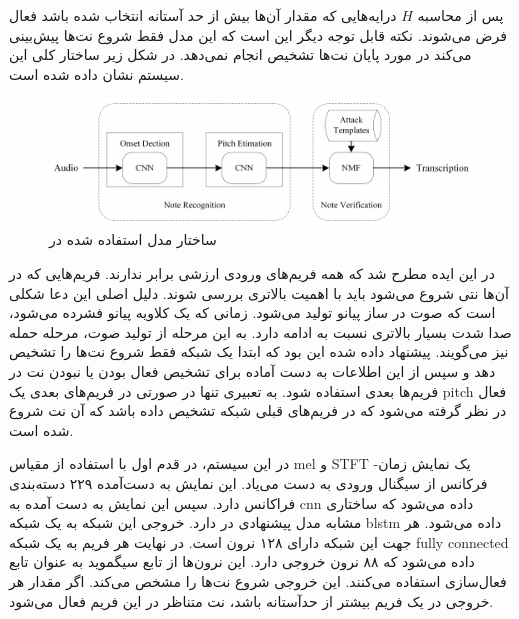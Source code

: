پس از محاسبه $H$ درایه‌هایی که مقدار آن‌ها بیش از حد آستانه انتخاب شده باشد فعال
فرض می‌شوند. نکته قابل توجه دیگر این است که این مدل فقط شروع نت‌ها پیش‌بینی
می‌کند در مورد پایان نت‌ها تشخیص انجام نمی‌دهد. در شکل زیر ساختار کلی این سیستم
نشان داده شده است.
\begin{figure}[ht]
    \centering
    \includegraphics[width=12cm]{./statics/wang2017two_architecture.png}
    \caption{ساختار مدل استفاده شده در \cite{wang2017two}}
\end{figure}

در \cite{hawthorne2017onsets} این ایده مطرح شد که همه فریم‌‌های ورودی ارزشی برابر
ندارند. فریم‌هایی که در آن‌ها نتی شروع می‌شود باید با اهمیت بالاتری بررسی شوند.
دلیل اصلی این دعا شکلی است که صوت در ساز پیانو تولید می‌شود. زمانی که یک کلاویه
پیانو فشرده می‌شود، صدا شدت بسیار بالاتری نسبت به ادامه دارد. به این مرحله از
تولید صوت، مرحله حمله نیز می‌گویند. پیشنهاد داده شده این بود که ابتدا یک شبکه
فقط شروع نت‌ها را تشخیص دهد و سپس از این اطلاعات به دست آماده برای تشخیص فعال
بودن یا نبودن نت‌ در فریم‌ها بعدی استفاده شود. به تعبیری تنها در صورتی در فریم‌های
بعدی یک \gls{pitch} فعال در نظر گرفته می‌شود که در فریم‌های قبلی شبکه تشخیص داده
باشد که آن نت شروع شده است.

در این سیستم، در قدم اول با استفاده از مقیاس mel و \gls{STFT} یک نمایش
زمان-فرکانس از سیگنال ورودی به دست می‌یاد. این نمایش به دست‌آمده ۲۲۹ دسته‌بندی
فراکانس دارد. سپس این نمایش به دست آمده به \gls{cnn} داده می‌شود که ساختاری
مشابه مدل پیشنهادی در \cite{kelz2016potential} دارد. خروجی این شبکه به یک شبکه
\gls{blstm} داده می‌شود. هر جهت این شبکه دارای ۱۲۸ نرون است. در نهایت هر فریم به
یک شبکه \gls{fully connected} داده می‌شود که ۸۸ نرون خروجی دارد. این نرون‌ها از
تابع سیگموید به عنوان تابع فعال‌سازی استفاده می‌کنند. این خروجی شروع نت‌ها را
مشخص می‌کند. اگر مقدار هر خروجی در یک فریم بیشتر از حدآستانه باشد، نت متناظر در
این فریم فعال می‌شود.

